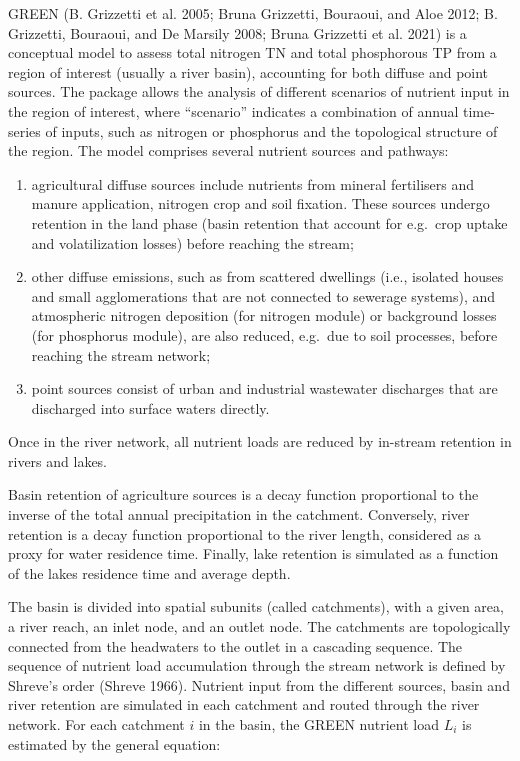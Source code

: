 GREEN (B. Grizzetti et al. 2005; Bruna Grizzetti, Bouraoui, and Aloe 2012; B. Grizzetti, Bouraoui, and De Marsily 2008; Bruna Grizzetti et al. 2021) is a conceptual model to assess total nitrogen TN and total phosphorous TP from a region of interest (usually a river basin), accounting for both diffuse and point sources. The package allows the analysis of different scenarios of nutrient input in the region of interest, where ``scenario'' indicates a combination of annual time-series of inputs, such as nitrogen or phosphorus and the topological structure of the region. The model comprises several nutrient sources and pathways:

\begin{enumerate}
\def\labelenumi{\arabic{enumi}.}
\tightlist
\item
  agricultural diffuse sources include nutrients from mineral fertilisers and manure application, nitrogen crop and soil fixation. These sources undergo retention in the land phase (basin retention that account for e.g.~crop uptake and volatilization losses) before reaching the stream;
\item
  other diffuse emissions, such as from scattered dwellings (i.e., isolated houses and small agglomerations that are not connected to sewerage systems), and atmospheric nitrogen deposition (for nitrogen module) or background losses (for phosphorus module), are also reduced, e.g.~due to soil processes, before reaching the stream network;
\item
  point sources consist of urban and industrial wastewater discharges that are discharged into surface waters directly.
\end{enumerate}

\noindent Once in the river network, all nutrient loads are reduced by in-stream retention in rivers and lakes.

Basin retention of agriculture sources is a decay function proportional to the inverse of the total annual precipitation in the catchment. Conversely, river retention is a decay function proportional to the river length, considered as a proxy for water residence time. Finally, lake retention is simulated as a function of the lakes residence time and average depth.

The basin is divided into spatial subunits (called catchments), with a given area, a river reach, an inlet node, and an outlet node. The catchments are topologically connected from the headwaters to the outlet in a cascading sequence. The sequence of nutrient load accumulation through the stream network is defined by Shreve's order (Shreve 1966). Nutrient input from the different sources, basin and river retention are simulated in each catchment and routed through the river network. For each catchment \(i\) in the basin, the GREEN nutrient load \(L_i\) is estimated by the general equation:

